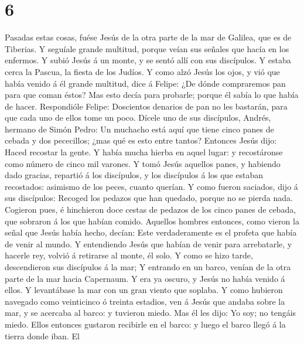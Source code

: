 \hypertarget{section-5}{%
\section{6}\label{section-5}}

 Pasadas estas cosas, fuése Jesús de la otra parte de la
mar de Galilea, que es de Tiberias.  Y seguíale grande
multitud, porque veían sus señales que hacía en los enfermos.
 Y subió Jesús á un monte, y se sentó allí con sus
discípulos.  Y estaba cerca la Pascua, la fiesta de los
Judíos.  Y como alzó Jesús los ojos, y vió que había
venido á él grande multitud, dice á Felipe: ¿De dónde compraremos pan
para que coman éstos?  Mas esto decía para probarle;
porque él sabía lo que había de hacer.  Respondióle
Felipe: Doscientos denarios de pan no les bastarán, para que cada uno de
ellos tome un poco.  Dícele uno de sus discípulos, Andrés,
hermano de Simón Pedro:  Un muchacho está aquí que tiene
cinco panes de cebada y dos pececillos; ¿mas qué es esto entre tantos?
 Entonces Jesús dijo: Haced recostar la gente. Y había
mucha hierba en aquel lugar: y recostáronse como número de cinco mil
varones.  Y tomó Jesús aquellos panes, y habiendo dado
gracias, repartió á los discípulos, y los discípulos á los que estaban
recostados: asimismo de los peces, cuanto querían.  Y
como fueron saciados, dijo á sus discípulos: Recoged los pedazos que han
quedado, porque no se pierda nada.  Cogieron pues, é
hinchieron doce cestas de pedazos de los cinco panes de cebada, que
sobraron á los que habían comido.  Aquellos hombres
entonces, como vieron la señal que Jesús había hecho, decían: Este
verdaderamente es el profeta que había de venir al mundo.
 Y entendiendo Jesús que habían de venir para
arrebatarle, y hacerle rey, volvió á retirarse al monte, él solo.
 Y como se hizo tarde, descendieron sus discípulos á la
mar;  Y entrando en un barco, venían de la otra parte de
la mar hacia Capernaum. Y era ya oscuro, y Jesús no había venido á
ellos.  Y levantábase la mar con un gran viento que
soplaba.  Y como hubieron navegado como veinticinco ó
treinta estadios, ven á Jesús que andaba sobre la mar, y se acercaba al
barco: y tuvieron miedo.  Mas él les dijo: Yo soy; no
tengáis miedo.  Ellos entonces gustaron recibirle en el
barco: y luego el barco llegó á la tierra donde iban.  El
